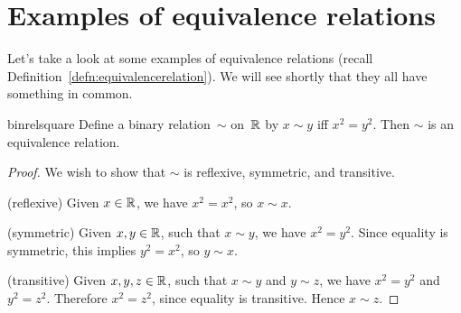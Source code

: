 
\section{Examples of equivalence relations\quad{}} 
 \label{sec:EquivalenceRelations:ExampleEquivRel}

Let's take a look at some examples of equivalence relations (recall Definition~\ref{defn:equivalencerelation}). We will see shortly that they all have something in common.

\begin{example}{binrelsquare}
Define a binary relation~$\sim$ on~$\mathbb{R}$ by $x \sim y$ iff $x^2 = y^2$. Then $\sim$ is an equivalence relation.

\begin{proof}
We wish to show that $\sim$ is reflexive, symmetric, and transitive.

\noindent
(reflexive) Given $x \in \mathbb{R} $, we have $x^2 = x^2$, so $x \sim x$.

\noindent
(symmetric) Given $x,y \in \mathbb{R}$, such that $x \sim y$, we have $x^2 = y^2$. Since equality is symmetric, this implies $y^2 = x^2$, so $y \sim x$.

\noindent
(transitive) Given $x,y,z \in \mathbb{R}$, such that $x \sim y$ and $y \sim z$, we have $x^2 = y^2$ and $y^2 = z^2$. Therefore $x^2 = z^2$, since equality is transitive. Hence $x \sim z$.
\end{proof}
\end{example}





